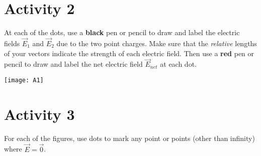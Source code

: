 \documentclass[]{article}
\begin{document}
\section*{Activity 2}%
At each of the dots, use a \textbf{black} pen or pencil to draw and label the electric fields $ \vec{E}_{1} $ and $ \vec{E}_{2} $ due to the two point charges. Make sure that the \textit{relative} lengths of your vectors indicate the strength of each electric field. Then use a \textbf{red} pen or pencil to draw and label the net electric field $ \vec{E}_{net} $ at each dot.

\begin{center}
	\texttt{[image: A1]}
\end{center}
\iffalse
\phantom{\parbox{\textwidth}{
In (b), the $ \vec{E}_{1} $ vectors now point toward $ q_{1} $, as it is negative.
}}
\fi

\section*{Activity 3}%
For each of the figures, use dots to mark any point or points (other than infinity) where $ \vec{E} = \vec{0} $.
\end{document}
